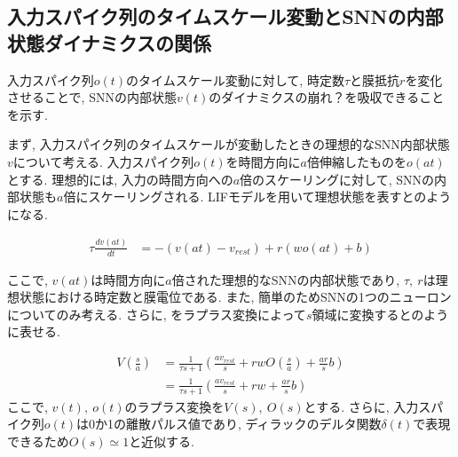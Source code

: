 \makeatletter %
\subsection{入力スパイク列のタイムスケール変動とSNNの内部状態ダイナミクスの関係}

入力スパイク列$o(t)$のタイムスケール変動に対して, 時定数$\tau$と膜抵抗$r$を変化させることで, SNNの内部状態$v(t)$のダイナミクスの崩れ？を吸収できることを示す.

まず, 入力スパイク列のタイムスケールが変動したときの理想的なSNN内部状態$v$について考える.
入力スパイク列$o(t)$を時間方向に$a$倍伸縮したものを$o(at)$とする.
理想的には, 入力の時間方向への$a$倍のスケーリングに対して, SNNの内部状態も$a$倍にスケーリングされる.
LIFモデルを用いて理想状態を表すとのようになる.

\begin{equation}
    \begin{split}
        \tau \frac{dv(at)}{dt} &= -(v(at)-v_{rest}) + r(w o(at) + b)
    \end{split}
    \label{sec2:eq:ideal}
\end{equation}

ここで, $v(at)$は時間方向に$a$倍された理想的なSNNの内部状態であり, $\tau,~r$は理想状態における時定数と膜電位である.
また, 簡単のためSNNの1つのニューロンについてのみ考える.
さらに, をラプラス変換によって$s$領域に変換するとのように表せる.

\begin{equation}
    \begin{split}
        V(\frac{s}{a}) &= \frac{1}{\tau s+1}(\frac{a v_{rest}}{s}+r w O(\frac{s}{a})+\frac{ar}{s}b)\\
        &= \frac{1}{\tau s+1}(\frac{a v_{rest}}{s}+r w +\frac{ar}{s}b)
    \end{split}
    \label{sec2:eq:ideal_laplace}
\end{equation}
ここで, $v(t),~o(t)$のラプラス変換を$V(s), ~ O(s)$とする.
さらに, 入力スパイク列$o(t)$は0か1の離散パルス値であり, ディラックのデルタ関数$\delta(t)$で表現できる\cite{Henkes2024}ため$O(s)\simeq1$と近似する.


